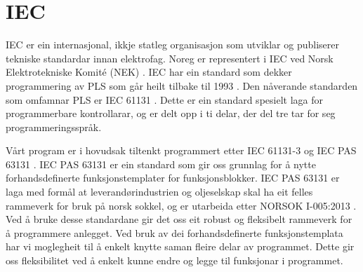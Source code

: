 \section{IEC}
\thispagestyle{fancy}
\label{sec:5.2}


\gls{IEC} \citep{IEC} er ein internasjonal, ikkje statleg organisasjon som utviklar og publiserer tekniske standardar innan elektrofag. 
Noreg er representert i \gls{IEC} ved Norsk Elektrotekniske Komité (\gls{NEK}) \citep{IEC-SNL}. 
\gls{IEC} har ein standard som dekker programmering av \gls{PLS} som går heilt tilbake til 1993 \citep{Wiki-93}. 
Den nåverande standarden som omfamnar PLS er IEC 61131 \citep{IEC-61131}. Dette er ein standard spesielt laga for programmerbare kontrollarar, og er delt opp i ti delar, der del tre tar for seg programmeringsspråk. 

Vårt program er i hovudsak tiltenkt programmert etter \gls{IEC} 61131-3 og \gls{IEC} \gls{PAS} 63131 \citep{IEC-63131}. 
\Gls{IEC} \gls{PAS} 63131 er ein standard som gir oss grunnlag for å nytte forhandsdefinerte funksjonstemplater for funksjonsblokker. 
\gls{IEC} \gls{PAS} 63131 er laga med formål at leverandørindustrien og oljeselskap skal ha eit felles rammeverk for bruk på norsk sokkel, og er utarbeida etter NORSOK I-005:2013 \citep{NORSOK}.
Ved å bruke desse standardane gir det oss eit robust og fleksibelt rammeverk for å programmere anlegget. 
Ved bruk av dei forhandsdefinerte funksjonstemplata har vi moglegheit til å enkelt knytte saman fleire delar av programmet. 
Dette gir oss fleksibilitet ved å enkelt kunne endre og legge til funksjonar i programmet.  
\newpage


